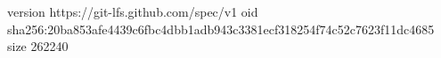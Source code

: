 version https://git-lfs.github.com/spec/v1
oid sha256:20ba853afe4439c6fbc4dbb1adb943c3381ecf318254f74c52c7623f11dc4685
size 262240
